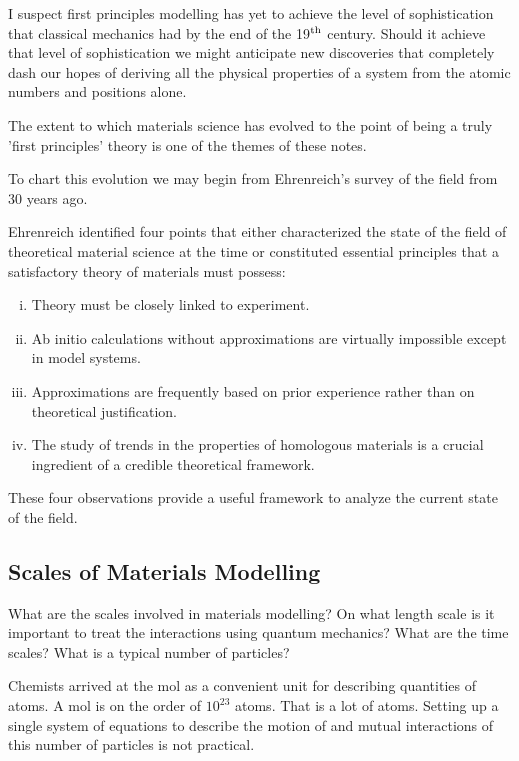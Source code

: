 I suspect first principles modelling has yet to 
achieve the level of sophistication
that classical mechanics had by the end 
of the 19$^{\rm th}$ century. Should it  
achieve that level of sophistication we might anticipate 
new discoveries that completely dash 
our hopes of deriving all the physical properties of a system
from the atomic numbers and positions alone.

The extent to which materials science has evolved to the point of being 
a truly 'first principles' theory is one of the themes of these notes. 
%
%

To chart this evolution we may begin from Ehrenreich's survey of the field from 30 years ago.

Ehrenreich identified four points that either characterized the state 
of the field of theoretical material science at the time or constituted essential principles 
that a satisfactory theory of materials must possess:
%
\begin{enumerate}[i)]
\item Theory must be closely linked to experiment.
\item Ab initio calculations without approximations are virtually impossible 
      except in model systems.
\item Approximations are frequently based on prior experience rather 
      than on theoretical justification.
\item The study of trends in the properties of homologous materials 
      is a crucial ingredient of a credible theoretical framework.
\end{enumerate}
%
These four observations provide a useful framework to analyze the current state of the field.


\subsection{Scales of Materials Modelling}
What are the scales involved in materials modelling?
On what length scale is it important to treat the interactions
using quantum mechanics? What are the time scales? 
What is a typical number of particles?

Chemists arrived at the mol as a convenient unit for describing
quantities of atoms. A mol is on the order of $10^{23}$ atoms. 
That is a lot of atoms. Setting up a single system of 
equations to describe the motion of and mutual 
interactions of this number of particles is not practical.

